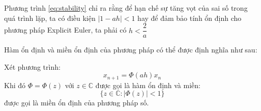 \documentclass[a4paper]{article}
\begin{document}
Phương trình \eqref{eq:stability} chỉ ra rằng để hạn chế sự tăng vọt của sai số trong quá trình lặp, ta có điều kiện $|1 - ah| < 1$ hay để đảm bảo tính ổn định cho phương pháp Explicit Euler, ta phải có $h < \dfrac{2}{a}$
\par
Hàm ổn định và miền ổn định của phương pháp có thể được định nghĩa như sau: \par
Xét phương trình:
\begin{equation}\label{eq:stabi_func}
    x_{n+1} = \Phi(ah)x_n
\end{equation}
Khi đó $\Phi = \Phi(z)$ với $z \in \mathbb{C}$ được gọi là hàm ổn định và miền:
\begin{equation}\label{eq:stabi_region}
    \{z \in \mathbb{C}: |\Phi(z)| < 1\}
\end{equation}
được gọi là miền ổn định của phương pháp số.
\end{document}
